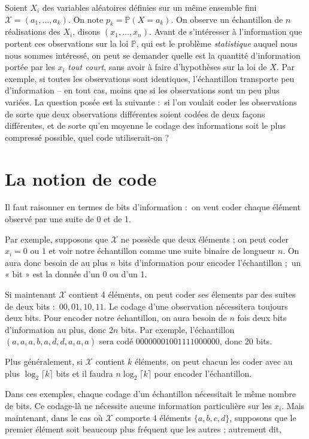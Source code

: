 \documentclass[
  10,
  letterpaper,
  DIV=11,
  numbers=noendperiod]{scrreport}
\theoremstyle{plain}
\theoremstyle{definition}
\theoremstyle{plain}
\theoremstyle{definition}
\theoremstyle{definition}
\theoremstyle{plain}
\theoremstyle{remark}
\begin{document}
Soient \(X_i\) des variables aléatoires définies sur un même ensemble
fini \(\mathcal{X} = (a_1, \dotsc, a_k)\). On note
\(p_k = \mathbb{P}(X = a_k)\). On observe un échantillon de \(n\)
réalisations des \(X_i\), disons \((x_1, \dotsc, x_n)\). Avant de
s'intéresser à l'information que portent ces observations sur la loi
\(\mathbb{P}\), qui est le problème \emph{statistique} auquel nous nous
sommes intéressé, on peut se demander quelle est la quantité
d'information portée par les \(x_i\) \emph{tout court}, sans avoir à
faire d'hypothèses sur la loi de \(X\). Par exemple, si toutes les
observations sont identiques, l'échantillon transporte peu d'information
-- en tout cas, moins que si les observations sont un peu plus variées.
La question posée est la suivante :~si l'on voulait coder les
observations de sorte que deux observations différentes soient codées de
deux façons différentes, et de sorte qu'en moyenne le codage des
informations soit le plus compressé possible, quel code utiliserait-on ?

\hypertarget{la-notion-de-code}{%
\section{La notion de code}\label{la-notion-de-code}}

Il faut raisonner en termes de bits d'information :~on veut coder chaque
élément observé par une suite de 0 et de 1.

Par exemple, supposons que \(\mathcal{X}\) ne possède que deux éléments
; on peut coder \(x_i=0\) ou \(1\) et voir notre échantillon comme une
suite binaire de longueur \(n\). On aura donc besoin de au plus \(n\)
bits d'information pour encoder l'échantillon ;~un « bit » est la donnée
d'un 0 ou d'un 1.

Si maintenant \(\mathcal{X}\) contient 4 éléments, on peut coder ses
élements par des suites de deux bits :~\(00,01,10, 11\). Le codage d'une
observation nécessitera toujours deux bits. Pour encoder notre
échantillon, on aura besoin de \(n\) fois deux bits d'information au
plus, donc \(2n\) bits. Par exemple, l'échantillon
\((a,a,a,b,a,d,d,a,a,a)\) sera codé \(00000001001111000000\), donc 20
bits.

Plus généralement, si \(\mathcal{X}\) contient \(k\) éléments, on peut
chacun les coder avec au plus \(\log_2\lceil k \rceil\) bits et il
faudra \(n\log_2\lceil k \rceil\) pour encoder l'échantillon.

Dans ces exemples, chaque codage d'un échantillon nécessitait le même
nombre de bits. Ce codage-là ne nécessite aucune information
particulière sur les \(x_i\). Mais maintenant, dans le cas où
\(\mathcal{X}\) comporte 4 éléments \(\{a,b,c,d\}\), supposons que le
premier élément soit beaucoup plus fréquent que les autres ; autrement
dit,
\end{document}
